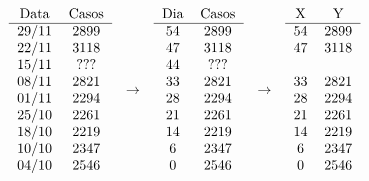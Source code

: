 \documentclass{article}
\begin{document}
            \[
                \begin{tabular}{c c}
                    Data  & Casos\\ \hline
                    29/11 & 2899\\
                    22/11 & 3118\\
                    15/11 & ??? \\
                    08/11 & 2821\\
                    01/11 & 2294\\
                    25/10 & 2261\\
                    18/10 & 2219\\
                    10/10 & 2347\\
                    04/10 & 2546
                \end{tabular} \hspace{2.5mm} \rightarrow \hspace{2.5mm}
                \begin{tabular}{c c}
                    Dia  & Casos\\ \hline
                    54   & 2899\\
                    47   & 3118\\
                    44   & ??? \\
                    33   & 2821\\
                    28   & 2294\\
                    21   & 2261\\
                    14   & 2219\\
                    6    & 2347\\
                    0    & 2546
                \end{tabular} \hspace{2.5mm} \rightarrow \hspace{2.5mm}
                \begin{tabular}{c c}
                    X  & Y\\ \hline
                    54 & 2899\\
                    47 & 3118\\
                       &     \\
                    33 & 2821\\
                    28 & 2294\\
                    21 & 2261\\
                    14 & 2219\\
                    6  & 2347\\
                    0  & 2546
                \end{tabular}
            \]
\end{document}
